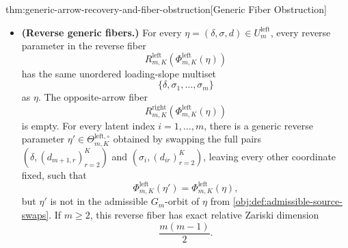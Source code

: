 \begin{theoremv}{thm:generic-arrow-recovery-and-fiber-obstruction}[Generic Fiber Obstruction]
\begin{itemize}
\item \textbf{(Reverse generic fibers.)}  For every \(\eta=(\delta,\sigma,d)\in U^{\mathrm{left}}_m\), every reverse parameter in the reverse fiber
\[
R^{\mathrm{left}}_{m,K}\!\left(\Phi^{\mathrm{left}}_{m,K}(\eta)\right)
\]
has the same unordered loading-slope multiset
\[
\{\delta,\sigma_1,\ldots,\sigma_m\}
\]
as \(\eta\).  The opposite-arrow fiber
\[
R^{\mathrm{right}}_{m,K}\!\left(\Phi^{\mathrm{left}}_{m,K}(\eta)\right)
\]
is empty.  For every latent index \(i=1,\ldots,m\), there is a generic reverse parameter \(\eta'\in\Theta^{\mathrm{left},\circ}_{m,K}\) obtained by swapping the full pairs \((\delta,(d_{m+1,r})_{r=2}^K)\) and \((\sigma_i,(d_{ir})_{r=2}^K)\), leaving every other coordinate fixed, such that
\[
\Phi^{\mathrm{left}}_{m,K}(\eta')
=
\Phi^{\mathrm{left}}_{m,K}(\eta),
\]
but \(\eta'\) is not in the admissible \(G_m\)-orbit of \(\eta\) from \cref{obj:def:admissible-source-swaps}.  If \(m\ge 2\), this reverse fiber has exact relative Zariski dimension
\[
\frac{m(m-1)}{2}.
\]
\end{itemize}
\end{theoremv}

